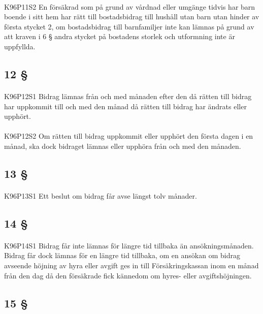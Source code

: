\documentclass[a4paper,notitlepage,openany,10pt]{book}
\begin{document}
\paragraph*{}
{\tiny K96P11S2}
En försäkrad som på grund av vårdnad eller umgänge tidvis har barn boende i sitt hem har rätt till bostadsbidrag till hushåll utan barn utan hinder av första stycket 2, om bostadsbidrag till barnfamiljer inte kan lämnas på grund av att kraven i 6 § andra stycket på bostadens storlek och utformning inte är uppfyllda.
\subsection*{12 §}
\paragraph*{}
{\tiny K96P12S1}
Bidrag lämnas från och med månaden efter den då rätten till bidrag har uppkommit till och med den månad då rätten till bidrag har ändrats eller upphört.
\paragraph*{}
{\tiny K96P12S2}
Om rätten till bidrag uppkommit eller upphört den första dagen i en månad, ska dock bidraget lämnas eller upphöra från och med den månaden.
\subsection*{13 §}
\paragraph*{}
{\tiny K96P13S1}
Ett beslut om bidrag får avse längst tolv månader.
\subsection*{14 §}
\paragraph*{}
{\tiny K96P14S1}
Bidrag får inte lämnas för längre tid tillbaka än ansökningsmånaden. Bidrag får dock lämnas för en längre tid tillbaka, om en ansökan om bidrag avseende höjning av hyra eller avgift ges in till Försäkringskassan inom en månad från den dag då den försäkrade fick kännedom om hyres- eller avgiftshöjningen.
\subsection*{15 §}
\end{document}

